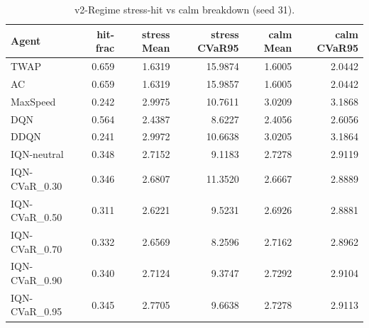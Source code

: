 \begin{table}[H]
    \centering
    \caption{v2-Regime stress-hit vs calm breakdown (seed 31).}
    \label{tab:v2_regime_breakdown}
    \begin{tabular}{@{}lrrrrr@{}}
        \toprule
        Agent & hit-frac & stress Mean & stress CVaR95 & calm Mean & calm CVaR95 \\
        \midrule
        TWAP & 0.659 & 1.6319 & 15.9874 & 1.6005 & 2.0442 \\
        AC & 0.659 & 1.6319 & 15.9857 & 1.6005 & 2.0442 \\
        MaxSpeed & 0.242 & 2.9975 & 10.7611 & 3.0209 & 3.1868 \\
        DQN & 0.564 & 2.4387 & 8.6227 & 2.4056 & 2.6056 \\
        DDQN & 0.241 & 2.9972 & 10.6638 & 3.0205 & 3.1864 \\
        IQN-neutral & 0.348 & 2.7152 & 9.1183 & 2.7278 & 2.9119 \\
        IQN-CVaR\_0.30 & 0.346 & 2.6807 & 11.3520 & 2.6667 & 2.8889 \\
        IQN-CVaR\_0.50 & 0.311 & 2.6221 & 9.5231 & 2.6926 & 2.8881 \\
        IQN-CVaR\_0.70 & 0.332 & 2.6569 & 8.2596 & 2.7162 & 2.8962 \\
        IQN-CVaR\_0.90 & 0.340 & 2.7124 & 9.3747 & 2.7292 & 2.9104 \\
        IQN-CVaR\_0.95 & 0.345 & 2.7705 & 9.6638 & 2.7278 & 2.9113 \\
        \bottomrule
    \end{tabular}
\end{table}
